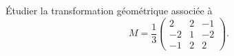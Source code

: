 \begin{enonce}
\begin{exercise}[ID={RMS124 E1219 CCP PSI},subtitle={},tags={}, difficulty={0}]
Étudier la transformation géométrique associée à 
\begin{equation*}
  M= \frac13 \begin{pmatrix} 2&2&-1\\ -2&1&-2\\ -1&2&2 \end{pmatrix}.
\end{equation*}
\end{exercise}
\begin{solution}
\end{solution}
\end{enonce}
